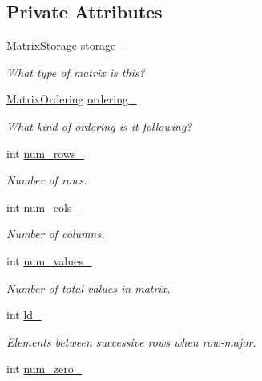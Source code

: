 \subsection*{Private Attributes}
\begin{DoxyCompactItemize}
\item 
\hyperlink{group__c02-enums_ga25b67ec6a2afeee69f9bb196a9c66619}{Matrix\+Storage} \hyperlink{classmtk_1_1Matrix_ae343697531e0849f20bed4a9760b9a54}{storage\+\_\+}
\begin{DoxyCompactList}\small\item\em What type of matrix is this? \end{DoxyCompactList}\item 
\hyperlink{group__c02-enums_ga622801bd9f912d0f976c3e383f5f581c}{Matrix\+Ordering} \hyperlink{classmtk_1_1Matrix_a8b66e0d130cc8ad19c426acd42edaf55}{ordering\+\_\+}
\begin{DoxyCompactList}\small\item\em What kind of ordering is it following? \end{DoxyCompactList}\item 
int \hyperlink{classmtk_1_1Matrix_ab635ce1dd96c26ee99a75b564f03f091}{num\+\_\+rows\+\_\+}
\begin{DoxyCompactList}\small\item\em Number of rows. \end{DoxyCompactList}\item 
int \hyperlink{classmtk_1_1Matrix_a3d11a942d6dda7ca16e162c12e854b74}{num\+\_\+cols\+\_\+}
\begin{DoxyCompactList}\small\item\em Number of columns. \end{DoxyCompactList}\item 
int \hyperlink{classmtk_1_1Matrix_ac3f64429ee2509c502ce7f0d75341da0}{num\+\_\+values\+\_\+}
\begin{DoxyCompactList}\small\item\em Number of total values in matrix. \end{DoxyCompactList}\item 
int \hyperlink{classmtk_1_1Matrix_a8cb46a0aa1d665a9f92f14e66a307bd5}{ld\+\_\+}
\begin{DoxyCompactList}\small\item\em Elements between successive rows when row-\/major. \end{DoxyCompactList}\item 
int \hyperlink{classmtk_1_1Matrix_a6daac2b61bed10026785c1eb0328eef9}{num\+\_\+zero\+\_\+}

\end{DoxyCompactItemize}
